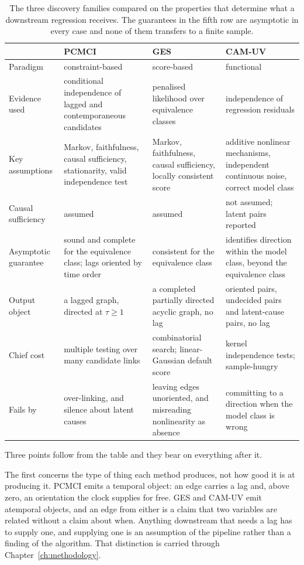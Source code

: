 \begin{table}[htbp]
\centering
\small
\caption[The three discovery families compared]{The three discovery families compared on the properties that determine what a downstream regression receives. The guarantees in the fifth row are asymptotic in every case and none of them transfers to a finite sample.}
\label{tab:algo-comparison}
\begin{tabularx}{\textwidth}{@{}l X X X@{}}
\toprule
 & \textbf{PCMCI} & \textbf{GES} & \textbf{CAM-UV} \\
\midrule
Paradigm
  & constraint-based
  & score-based
  & functional \\[0.4em]
Evidence used
  & conditional independence of lagged and contemporaneous candidates
  & penalised likelihood over equivalence classes
  & independence of regression residuals \\[0.4em]
Key assumptions
  & Markov, faithfulness, causal sufficiency, stationarity, valid independence test
  & Markov, faithfulness, causal sufficiency, locally consistent score
  & additive nonlinear mechanisms, independent continuous noise, correct model class \\[0.4em]
Causal sufficiency
  & assumed
  & assumed
  & not assumed; latent pairs reported \\[0.4em]
Asymptotic guarantee
  & sound and complete for the equivalence class; lags oriented by time order
  & consistent for the equivalence class
  & identifies direction within the model class, beyond the equivalence class \\[0.4em]
Output object
  & a lagged graph, directed at $\tau \ge 1$
  & a completed partially directed acyclic graph, no lag
  & oriented pairs, undecided pairs and latent-cause pairs, no lag \\[0.4em]
Chief cost
  & multiple testing over many candidate links
  & combinatorial search; linear-Gaussian default score
  & kernel independence tests; sample-hungry \\[0.4em]
Fails by
  & over-linking, and silence about latent causes
  & leaving edges unoriented, and misreading nonlinearity as absence
  & committing to a direction when the model class is wrong \\
\bottomrule
\end{tabularx}
\end{table}

Three points follow from the table and they bear on everything after it.

The first concerns the type of thing each method produces, not how good it is at producing it. PCMCI emits a temporal object: an edge carries a lag and, above zero, an orientation the clock supplies for free. GES and CAM-UV emit atemporal objects, and an edge from either is a claim that two variables are related without a claim about when. Anything downstream that needs a lag has to supply one, and supplying one is an assumption of the pipeline rather than a finding of the algorithm. That distinction is carried through Chapter~\ref{ch:methodology}.


